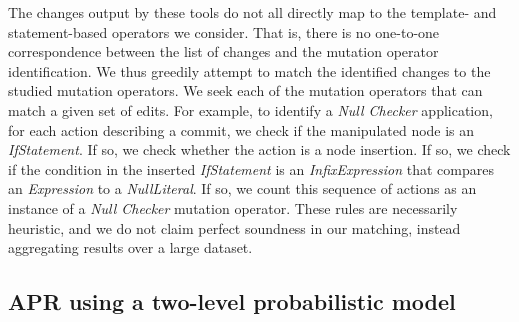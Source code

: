\documentclass[conference]{IEEEtran}
\begin{document}
The changes output by these tools do not all directly map to the template- and
statement-based operators we consider.  That is, there is no one-to-one
correspondence between the list of changes and the mutation operator
identification. We thus greedily attempt to match the identified changes to the 
studied
mutation operators. We seek each of the mutation operators that can match a given set
of edits.  For example, to identify
a \emph{Null Checker} application, for each action describing a commit, we check
if the manipulated node
is an \emph{IfStatement}.  If so, we check whether the action
is a node insertion.  If so, we check if the condition in the inserted
\emph{IfStatement} is an 
\emph{InfixExpression} that compares an 
\emph{Expression} to a
\emph{NullLiteral}. If so, we count this sequence of
actions as an instance of a \emph{Null Checker} mutation operator.  These rules are
necessarily heuristic, and we do not claim perfect soundness in our matching,
instead aggregating results over a large dataset.  






\subsection{APR using a two-level probabilistic model}
\end{document}

